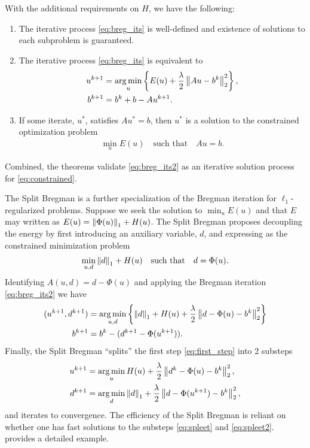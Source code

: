 \begin{thm}
	With the additional requirements on $H$, we have the following:
	\begin{enumerate}
		\item The iterative process \eqref{eq:breg_its} is well-defined and existence of solutions to each subproblem is guaranteed.
		
		\item The iterative process \eqref{eq:breg_its} is equivalent to
		\begin{align}
		\begin{split} 
		u^{k+1} &= \operatorname*{arg\,min}_u \left\{ 
		E(u) + \frac{\lambda}{2} \left\lVert A u - b^k\right\rVert^2_2
		\right\},
		\\
		b^{k+1} &= b^k + b - Au^{k+1}.
		\end{split}
		\label{eq:breg_its2}
		\end{align}
		
		\item If some iterate, $u^*$, satisfies $Au^* = b$, then $u^*$ is a solution to the constrained optimization problem 
		\begin{align}
		\min_u E(u) \quad\text{such that}\quad Au = b.
		\label{eq:constrained}
		\end{align}
	\end{enumerate}
\end{thm}
Combined, the theorems validate \eqref{eq:breg_its2} as an iterative solution process for \eqref{eq:constrained}.

The Split Bregman is a further specialization of the Bregman iteration for $\ell_1$-regularized problems. Suppose we seek the solution to $\min_u E(u)$ and that $E$ may written as $E(u) = \left\lVert\Phi(u)\right\rVert_1 + H(u)$. The Split Bregman proposes decoupling the energy by first introducing an auxiliary variable, $d$, and expressing as the constrained minimization problem 
\begin{align*}
\min_{u,d} \left\lVert d\right\rVert_1 + H(u)
\quad\text{such that}\quad d = \Phi(u).
\end{align*}
Identifying $A(u,d) = d - \Phi(u)$ and applying the Bregman iteration \eqref{eq:breg_its2} we have 
\begin{align}
(u^{k+1}, d^{k+1}) &= \operatorname*{arg\,min}_{u,d} \left\{
\left\lVert d\right\rVert_1 + H(u) + \frac{\lambda}{2}\left\lVert d - \Phi(u) - b^k\right\rVert^2_2 
\right\}
\label{eq:first_step}
\\ 
b^{k+1} 
&= b^k - (d^{k+1} - \Phi(u^{k+1})).
\end{align}
Finally, the Split Bregman ``splits'' the first step \eqref{eq:first_step} into 2 substeps
\begin{align}
u^{k+1} &= \operatorname*{arg\,min}_u H(u) + \frac{\lambda}{2} \left\lVert d^k - \Phi(u) - b^k\right\rVert^2_2 ,
\label{eq:spleet}
\\
d^{k+1} &= \operatorname*{arg\,min}_d \left\lVert d\right\rVert_1 + \frac{\lambda}{2} \left\lVert d - \Phi(u^{k+1}) - b^k\right\rVert^2_2, 
\label{eq:spleet2}
\end{align}
and iterates to convergence. The efficiency of the Split Bregman is reliant on whether one has fast solutions to the substeps \eqref{eq:spleet} and \eqref{eq:spleet2}.  provides a detailed example. 


